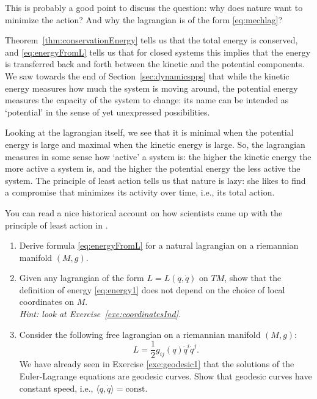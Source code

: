 \documentclass[english,fontsize=11pt,paper=a5,oneside]{scrbook}
\newcommand{\lag}{\langle}
\newcommand{\rag}{\rangle}
\let\d\relax
\newcommand{\d}{\mathrm{d}}
\theoremstyle{definition}
\newenvironment{remark}
  {\pushQED{\qed}\renewcommand{\qedsymbol}{$\lozenge$}\remarkx}
  {\popQED\endremarkx}
\newenvironment{exercise}
  {\pushQED{\qed}\renewcommand{\qedsymbol}{$\maltese$}\exercisex}
  {\popQED\endexercisex}
\begin{document}
\begin{remark}
  This is probably a good point to discuss the question: why does nature want to minimize the action? And why the lagrangian is of the form \eqref{eq:mechlag}?

  Theorem~\ref{thm:conservationEnergy} tells us that the total energy is conserved, and \eqref{eq:energyFromL} tells us that for closed systems this implies that the energy is transferred back and forth between the kinetic and the potential components.
  We saw towards the end of Section~\ref{sec:dynamicspps} that while the kinetic energy measures how much the system is moving around, the potential energy measures the capacity of the system to change: its name can be intended as `potential' in the sense of yet unexpressed possibilities.

  Looking at the lagrangian itself, we see that it is minimal when the potential energy is large and maximal when the kinetic energy is large.
  So, the lagrangian measures in some sense how `active' a system is: the higher the kinetic energy the more active a system is, and the higher the potential energy the less active the system.
  The principle of least action tells us that nature is lazy: she likes to find a compromise that minimizes its activity over time, i.e., its total action.

  You can read a nice historical account on how scientists came up with the principle of least action in \cite{lectures:baez}.
\end{remark}

\begin{exercise}
  \begin{enumerate}
    \item Derive formula \eqref{eq:energyFromL} for a natural lagrangian on a riemannian manifold $(M,g)$.
    \item Given any lagrangian of the form $L = L(q, \dot q)$ on $TM$, show that the definition of energy \eqref{eq:energy1} does not depend on the choice of local coordinates on $M$.\\\textit{Hint: look at Exercise~\ref{exe:coordinatesInd}.}
    \item Consider the following free lagrangian on a riemannian manifold $(M, g)$:
          \begin{equation}
            L = \frac12 g_{ij}(q)\dot q^i \dot q^j.
          \end{equation}
          We have already seen in Exercise \ref{exe:geodesic1} that the solutions of the Euler-Lagrange equations are geodesic curves.
          Show that geodesic curves have constant speed, i.e., $\lag\dot q, \dot q\rag = \mathrm{const}$.
  \end{enumerate}
\end{exercise}
\end{document}
